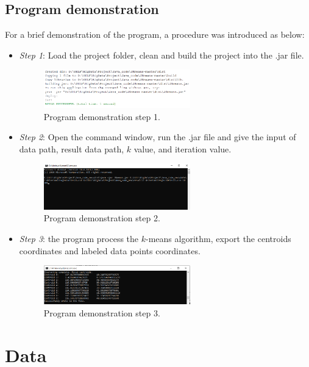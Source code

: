 \documentclass[journal]{IEEEtran}
\begin{document}
\subsection{Program demonstration}
For a brief demonstration of the program, a procedure was introduced as below:
\begin{itemize}
	\item \textit{Step 1}: Load the project folder, clean and build the project into the .jar file.
	\begin{figure}[!t]
		\centering
		\includegraphics[width=2.5in]{image/Step1.png}
		\caption{Program demonstration step 1.}
		\label{fig_step1}
	\end{figure}

	\item \textit{Step 2}: Open the command window, run the .jar file and give the input of data path, result data path, $k$ value, and iteration value.
	\begin{figure}[!t]
		\centering
		\includegraphics[width=2.5in]{image/Step2.png}
		\caption{Program demonstration step 2.}
		\label{fig_step2}
	\end{figure}
	
	\item \textit{Step 3}: the program process the $k$-means algorithm, export the centroids coordinates and labeled data points coordinates.
	\begin{figure}[!t]
		\centering
		\includegraphics[width=2.5in]{image/Step3.png}
		\caption{Program demonstration step 3.}
		\label{fig_step3}
	\end{figure}
\end{itemize}


\section{Data}
\end{document}

